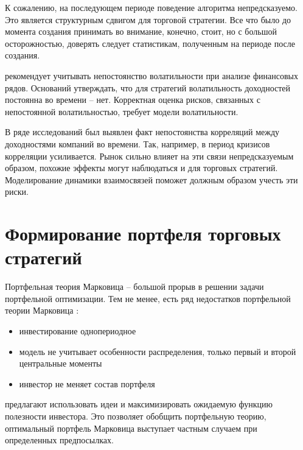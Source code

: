 К сожалению, на последующем периоде поведение алгоритма непредсказуемо. Это является структурным сдвигом для торговой стратегии. Все что было до момента создания принимать во внимание, конечно, стоит, но с большой осторожностью, доверять следует статистикам, полученным на периоде после создания.
 
\citep{dumas1998} рекомендует учитывать непостоянство волатильности при анализе финансовых рядов. Оснований утверждать, что для стратегий волатильность доходностей постоянна во времени -- нет. Корректная оценка рисков, связанных с непостоянной волатильностью, требует модели волатильности.

В ряде исследований \citep{vaga1990, oral2017} был выявлен факт непостоянства корреляций между доходностями компаний во времени. Так, например, в период кризисов корреляции усиливается. Рынок сильно влияет на эти связи непредсказуемым образом, похожие эффекты могут наблюдаться и для торговых стратегий. Моделирование динамики взаимосвязей поможет должным образом учесть эти риски.
\section{Формирование портфеля торговых стратегий}

Портфельная теория Марковица \citep{markovitz1959} -- большой прорыв в решении задачи портфельной оптимизации.
Тем не менее, есть ряд недостатков портфельной теории Марковица \citep{lorenz2008thesis}:
\begin{itemize}
	\item инвестирование однопериодное
	\item модель не учитывает особенности распределения, только первый и второй центральные моменты
	\item инвестор не меняет состав портфеля
\end{itemize}
\cite{lorenz2008thesis, bucciol2006} предлагают использовать идеи \cite{neumann1944} и максимизировать ожидаемую функцию полезности инвестора. Это позволяет обобщить портфельную теорию, оптимальный портфель Марковица выступает частным случаем при определенных предпосылках.

